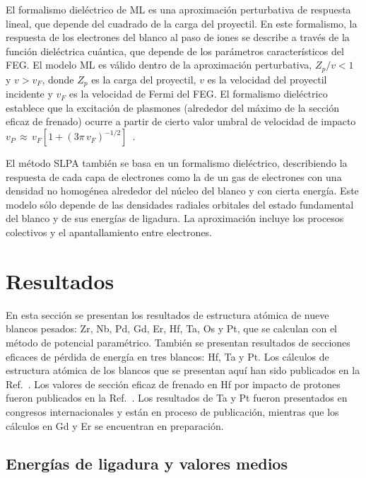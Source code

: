 El formalismo dieléctrico de ML es una aproximación perturbativa de 
respuesta lineal, que depende del cuadrado de la carga del proyectil. En 
este formalismo, la respuesta de los electrones del blanco al paso de 
iones se describe a través de la función dieléctrica cuántica, que 
depende de los parámetros característicos del FEG. El modelo ML es 
válido dentro de la aproximación perturbativa, $Z_p/v<1$ y $v>v_F$, 
donde $Z_p$ es la carga del proyectil, $v$ es la velocidad del proyectil
incidente y $v_F$ es la velocidad de Fermi del FEG. El formalismo 
dieléctrico establece que la excitación de plasmones (alrededor del 
máximo de la sección eficaz de frenado) ocurre a partir de cierto valor 
umbral de velocidad de impacto 
$v_P\,\approx\,v_F[1+(3\pi\,v_F)^{-1/2}]$~\cite{suppression}. 

El método SLPA también se basa en un formalismo dieléctrico, 
describiendo la respuesta de cada capa de electrones como la de un gas 
de electrones con una densidad no homogénea alrededor del núcleo del 
blanco y con cierta energía. Este modelo sólo depende de las densidades 
radiales orbitales del estado fundamental del blanco y de sus energías 
de ligadura. La aproximación incluye los procesos colectivos y el 
apantallamiento entre electrones. 

\section{Resultados}
\label{sec:results-heavy}

En esta sección se presentan los resultados de estructura atómica de 
nueve blancos pesados: Zr, Nb, Pd, Gd, Er, Hf, Ta, Os y Pt, que se 
calculan con el método de potencial paramétrico. También se presentan 
resultados de secciones eficaces de pérdida de energía en tres blancos: 
Hf, Ta y Pt. Los cálculos de estructura atómica de los blancos que se 
presentan aquí han sido publicados en la Ref.~\cite{Mendez:19relat}. Los 
valores de sección eficaz de frenado en Hf por impacto de protones 
fueron publicados en la Ref.~\cite{Montanari:20}. Los resultados de Ta y 
Pt fueron presentados en congresos internacionales y están en proceso de 
publicación, mientras que los cálculos en Gd y Er se encuentran en 
preparación. 

\subsection{Energías de ligadura y valores medios}
\label{subsec:results-target}

